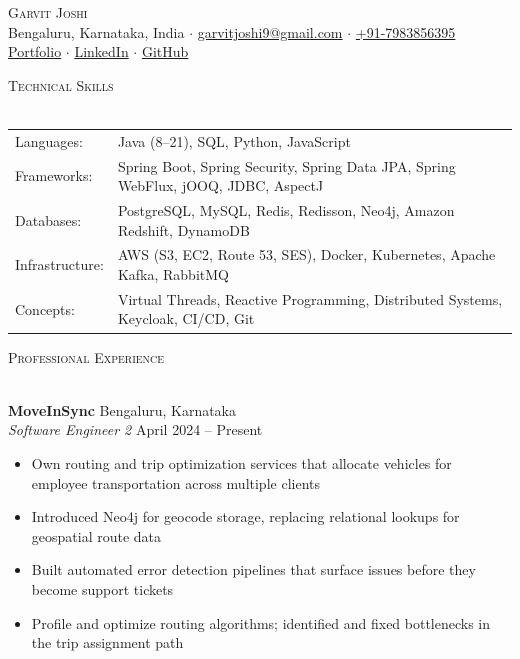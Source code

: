 \documentclass[a4paper]{article}
\newcommand{\lineunder} {
    \vspace*{-8pt} \\
    \hspace*{-18pt} \hrulefill \\
}
\newcommand{\header} [1] {
    {\hspace*{-18pt}\vspace*{6pt} \textsc{#1}}
    \vspace*{-6pt} \lineunder
}
\begin{document}
\vspace*{-30pt}

    

\vspace*{-10pt}
\begin{center}
	{\Huge \scshape {Garvit Joshi}}\\
	Bengaluru, Karnataka, India $\cdot$ \href{mailto:garvitjoshi9@gmail.com}{garvitjoshi9@gmail.com} $\cdot$ \href{tel:+917983856395}{+91-7983856395}\\
	\href{https://garvit-joshi.github.io}{Portfolio} $\cdot$ \href{https://www.linkedin.com/in/garvitjoshi9/}{LinkedIn} $\cdot$ \href{https://github.com/garvit-joshi/}{GitHub}\\
\end{center}

\header{Technical Skills}
\begin{tabular}{ l l }
	Languages: & Java (8--21), SQL, Python, JavaScript \\
	Frameworks: & Spring Boot, Spring Security, Spring Data JPA, Spring WebFlux, jOOQ, JDBC, AspectJ \\
	Databases: & PostgreSQL, MySQL, Redis, Redisson, Neo4j, Amazon Redshift, DynamoDB \\
	Infrastructure: & AWS (S3, EC2, Route 53, SES), Docker, Kubernetes, Apache Kafka, RabbitMQ \\
	Concepts: & Virtual Threads, Reactive Programming, Distributed Systems, Keycloak, CI/CD, Git \\
\end{tabular}
\vspace{0mm}

\header{Professional Experience}
\vspace{0mm}

\textbf{MoveInSync} \hfill Bengaluru, Karnataka\\
\textit{Software Engineer 2} \hfill April 2024 -- Present\\
\vspace{-1mm}
\begin{itemize} \itemsep -2pt
    \item Own routing and trip optimization services that allocate vehicles for employee transportation across multiple clients
    \item Introduced Neo4j for geocode storage, replacing relational lookups for geospatial route data
    \item Built automated error detection pipelines that surface issues before they become support tickets
    \item Profile and optimize routing algorithms; identified and fixed bottlenecks in the trip assignment path
\end{itemize}
\end{document}
